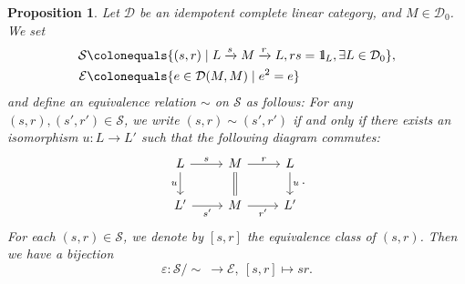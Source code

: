 \documentclass{surv-l}
\numberwithin{equation}{chapter}
\numberwithin{figure}{chapter}
\theoremstyle{plain}
\newtheorem{prp}[thm]{Proposition}
\theoremstyle{definition}
\theoremstyle{remark}
\newcommand{\id}{1\kern-.25em{\text{{\rm l}}}}
\newcommand{\Ar}[3]{\ar[from={#1}, to={#2}, #3]}
\begin{document}
\begin{prp}\label{Bprp:split-idemp}
Let ${\mathcal{D}}$ be an idempotent complete linear category, and
$M \in {\mathcal{D}}_0$.
We set
\begin{equation*}
\begin{aligned}
\mathcal{S}&\colonequals  \{(s, r) \mid L \xrightarrow{s} M \xrightarrow{r} L, rs = \id_L, \exists L \in {\mathcal{D}}_0\},\\
\mathcal{E}&\colonequals  \{e \in {\mathcal{D}}(M, M) \mid e^2 = e\}
\end{aligned}
\end{equation*}
and define an equivalence relation $\sim$ on $\mathcal{S}$ as follows:
For any $(s,r), (s',r') \in \mathcal{S}$, we write $(s,r) \sim (s',r')$ if and only if
there exists an isomorphism $u \colon L \to L'$ such that the following diagram commutes:
\begin{equation*}
\begin{tikzcd}
L & M & L\\
L' & M & L'
\Ar{1-1}{1-2}{"s"}
\Ar{1-2}{1-3}{"r"}
\Ar{2-1}{2-2}{"s'" '}
\Ar{2-2}{2-3}{"r'" '}
\Ar{1-1}{2-1}{"u" '}
\Ar{1-2}{2-2}{equal}
\Ar{1-3}{2-3}{"u"}
\end{tikzcd}.
\end{equation*}
For each $(s,r) \in \mathcal{S}$, we denote by $[s,r]$ the equivalence class of $(s,r)$.
Then we have a bijection
\begin{equation*}
\varepsilon \colon \mathcal{S}\!/\!\!\sim \ \to \mathcal{E},\  [s,r] \mapsto sr.
\end{equation*}
\end{prp}
\end{document}
